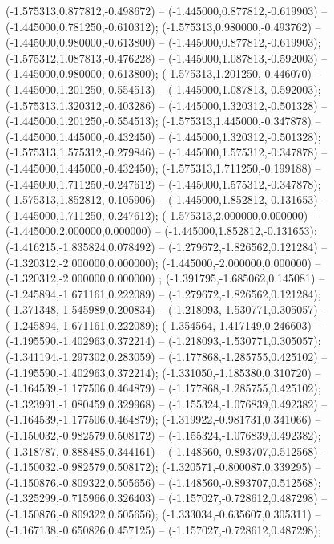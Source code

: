  (-1.575313,0.877812,-0.498672) -- (-1.445000,0.877812,-0.619903) -- (-1.445000,0.781250,-0.610312);
 (-1.575313,0.980000,-0.493762) -- (-1.445000,0.980000,-0.613800) -- (-1.445000,0.877812,-0.619903);
 (-1.575312,1.087813,-0.476228) -- (-1.445000,1.087813,-0.592003) -- (-1.445000,0.980000,-0.613800);
 (-1.575313,1.201250,-0.446070) -- (-1.445000,1.201250,-0.554513) -- (-1.445000,1.087813,-0.592003);
 (-1.575313,1.320312,-0.403286) -- (-1.445000,1.320312,-0.501328) -- (-1.445000,1.201250,-0.554513);
 (-1.575313,1.445000,-0.347878) -- (-1.445000,1.445000,-0.432450) -- (-1.445000,1.320312,-0.501328);
 (-1.575313,1.575312,-0.279846) -- (-1.445000,1.575312,-0.347878) -- (-1.445000,1.445000,-0.432450);
 (-1.575313,1.711250,-0.199188) -- (-1.445000,1.711250,-0.247612) -- (-1.445000,1.575312,-0.347878);
 (-1.575313,1.852812,-0.105906) -- (-1.445000,1.852812,-0.131653) -- (-1.445000,1.711250,-0.247612);
 (-1.575313,2.000000,0.000000) -- (-1.445000,2.000000,0.000000) -- (-1.445000,1.852812,-0.131653);
 (-1.416215,-1.835824,0.078492) -- (-1.279672,-1.826562,0.121284) -- (-1.320312,-2.000000,0.000000);
 (-1.445000,-2.000000,0.000000) -- (-1.320312,-2.000000,0.000000) ;
 (-1.391795,-1.685062,0.145081) -- (-1.245894,-1.671161,0.222089) -- (-1.279672,-1.826562,0.121284);
 (-1.371348,-1.545989,0.200834) -- (-1.218093,-1.530771,0.305057) -- (-1.245894,-1.671161,0.222089);
 (-1.354564,-1.417149,0.246603) -- (-1.195590,-1.402963,0.372214) -- (-1.218093,-1.530771,0.305057);
 (-1.341194,-1.297302,0.283059) -- (-1.177868,-1.285755,0.425102) -- (-1.195590,-1.402963,0.372214);
 (-1.331050,-1.185380,0.310720) -- (-1.164539,-1.177506,0.464879) -- (-1.177868,-1.285755,0.425102);
 (-1.323991,-1.080459,0.329968) -- (-1.155324,-1.076839,0.492382) -- (-1.164539,-1.177506,0.464879);
 (-1.319922,-0.981731,0.341066) -- (-1.150032,-0.982579,0.508172) -- (-1.155324,-1.076839,0.492382);
 (-1.318787,-0.888485,0.344161) -- (-1.148560,-0.893707,0.512568) -- (-1.150032,-0.982579,0.508172);
 (-1.320571,-0.800087,0.339295) -- (-1.150876,-0.809322,0.505656) -- (-1.148560,-0.893707,0.512568);
 (-1.325299,-0.715966,0.326403) -- (-1.157027,-0.728612,0.487298) -- (-1.150876,-0.809322,0.505656);
 (-1.333034,-0.635607,0.305311) -- (-1.167138,-0.650826,0.457125) -- (-1.157027,-0.728612,0.487298);
